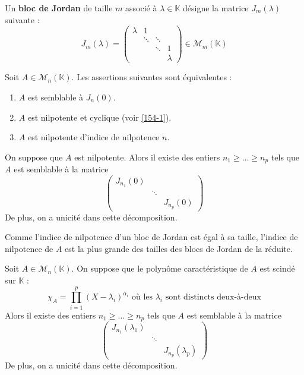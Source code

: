 	
	\begin{definition}
		Un \textbf{bloc de Jordan} de taille $m$ associé à $\lambda \in \mathbb{K}$ désigne la matrice $J_m(\lambda)$ suivante :
		\[ J_m(\lambda) = \begin{pmatrix} \lambda & 1 & \\ & \ddots & \ddots & \\ & & \ddots & 1 \\ & & & \lambda \end{pmatrix} \in \mathcal{M}_m(\mathbb{K}) \]
	\end{definition}
	
	\begin{proposition}
		Soit $A \in \mathcal{M}_n(\mathbb{K})$. Les assertions suivantes sont équivalentes :
		\begin{enumerate}[label=(\roman*)]
			\item $A$ est semblable à $J_n(0)$.
			\item $A$ est nilpotente et cyclique (voir \cref{154-1}).
			\item $A$ est nilpotente d'indice de nilpotence $n$.
		\end{enumerate}
	\end{proposition}
	
	\begin{theorem}
		On suppose que $A$ est nilpotente. Alors il existe des entiers $n_1 \geq \dots \geq n_p$ tels que $A$ est semblable à la matrice
		\[ \begin{pmatrix} J_{n_1}(0) & & \\ & \ddots & \\ & & J_{n_p}(0) \end{pmatrix} \]
		De plus, on a unicité dans cette décomposition.
	\end{theorem}
	
	\begin{remark}
		Comme l'indice de nilpotence d'un bloc de Jordan est égal à sa taille, l'indice de nilpotence de $A$ est la plus grande des tailles des blocs de Jordan de la réduite.
	\end{remark}
	
	
	\begin{theorem}
		Soit $A \in \mathcal{M}_n(\mathbb{K})$. On suppose que le polynôme caractéristique de $A$ est scindé sur $\mathbb{K}$ :
		\[ \chi_A = \prod_{i=1}^p (X - \lambda_i)^{\alpha_i} \text{ où les } \lambda_i \text{ sont distincts deux-à-deux} \]
		Alors il existe des entiers $n_1 \geq \dots \geq n_p$ tels que $A$ est semblable à la matrice
		\[ \begin{pmatrix} J_{n_1}(\lambda_1) & & \\ & \ddots & \\ & & J_{n_p}(\lambda_p) \end{pmatrix} \]
		De plus, on a unicité dans cette décomposition.
	\end{theorem}
	
